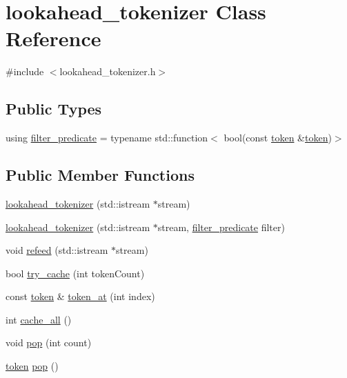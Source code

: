 \hypertarget{classlookahead__tokenizer}{}\section{lookahead\+\_\+tokenizer Class Reference}
\label{classlookahead__tokenizer}


{\ttfamily \#include $<$lookahead\+\_\+tokenizer.\+h$>$}

\subsection*{Public Types}
\begin{DoxyCompactItemize}
\item 
using \mbox{\hyperlink{classlookahead__tokenizer_aa661c2cf70b109f34b64c9d910d6bd9e}{filter\+\_\+predicate}} = typename std\+::function$<$ bool(const \mbox{\hyperlink{classtoken}{token}} \&\mbox{\hyperlink{classtoken}{token}})$>$
\end{DoxyCompactItemize}
\subsection*{Public Member Functions}
\begin{DoxyCompactItemize}
\item 
\mbox{\hyperlink{classlookahead__tokenizer_a563c4ea223d63bc32c184d529f134c1a}{lookahead\+\_\+tokenizer}} (std\+::istream $\ast$stream)
\item 
\mbox{\hyperlink{classlookahead__tokenizer_a6d2c0e59001a9e65bbb87f27fa764246}{lookahead\+\_\+tokenizer}} (std\+::istream $\ast$stream, \mbox{\hyperlink{classlookahead__tokenizer_aa661c2cf70b109f34b64c9d910d6bd9e}{filter\+\_\+predicate}} filter)
\item 
void \mbox{\hyperlink{classlookahead__tokenizer_a872954e0ef8b074e466d23ca38319900}{refeed}} (std\+::istream $\ast$stream)
\item 
bool \mbox{\hyperlink{classlookahead__tokenizer_a4f76ccb0a417fa5579e5607aa8acd9be}{try\+\_\+cache}} (int token\+Count)
\item 
const \mbox{\hyperlink{classtoken}{token}} \& \mbox{\hyperlink{classlookahead__tokenizer_ab94756fe32e75e9ecb051b7f6fd6796a}{token\+\_\+at}} (int index)
\item 
int \mbox{\hyperlink{classlookahead__tokenizer_a876641e4468cffe0bd931fe640f1ea9e}{cache\+\_\+all}} ()
\item 
void \mbox{\hyperlink{classlookahead__tokenizer_a32f1b0097babb1211d9538e18c81ceb2}{pop}} (int count)
\item 
\mbox{\hyperlink{classtoken}{token}} \mbox{\hyperlink{classlookahead__tokenizer_a192149a84e3f86637f3fb8850bbf541d}{pop}} ()
\end{DoxyCompactItemize}


